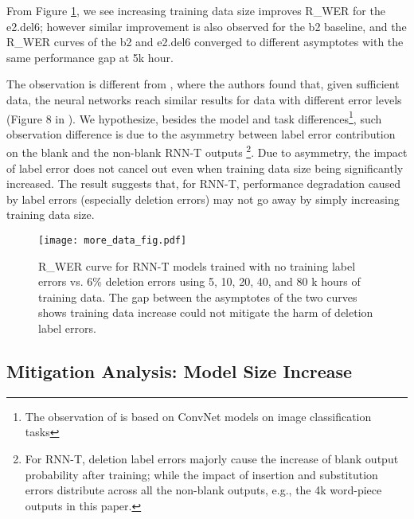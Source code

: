 \documentclass{article}
\begin{document}
From Figure \ref{fig:exp2}, we see increasing training data size improves R\_WER for the e2.del6; however similar improvement is also observed for the b2 baseline, and the R\_WER curves of the b2 and e2.del6 converged to different asymptotes with the same performance gap at 5k hour. 

The observation is different from \cite{Rolnick2017}, where the authors found that, given sufficient data, the neural networks reach similar results for data with different error levels (Figure 8 in \cite{Rolnick2017}). We hypothesize, besides the model and task differences\footnote{The observation of \cite{Rolnick2017} is based on ConvNet models on image classification tasks}, such observation difference is due to the asymmetry between label error contribution on the blank and the non-blank RNN-T outputs \footnote{For RNN-T, deletion label errors majorly cause the increase of blank output probability after training; while the impact of insertion and substitution errors distribute across all the non-blank outputs, e.g., the 4k word-piece outputs in this paper.}. Due to asymmetry, the impact of label error does not cancel out even when training data size being significantly increased. The result suggests that, for RNN-T, performance degradation caused by label errors (especially  deletion errors) may not go away by simply increasing training data size.

\begin{figure}[h]
	\centering
	\texttt{[image: more\_data\_fig.pdf]} 
	\caption{R\_WER curve for RNN-T models trained with no training label errors vs. 6\% deletion errors using 5, 10, 20, 40, and 80 k hours of training data. The gap  between the asymptotes of the two curves shows training data increase could not mitigate the harm of deletion label errors.}
	\label{fig:exp2}
\end{figure}


\subsection{Mitigation Analysis: Model Size Increase}\label{sec:mdl_sz_inc}
\end{document}

